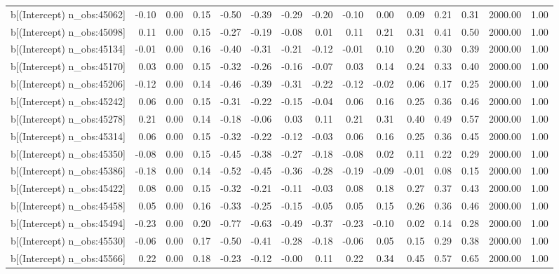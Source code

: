 \begin{table}[ht]
\begin{tabular}{rrrrrrrrrrrrrrr}
  b[(Intercept) n\_obs:45062] & -0.10 & 0.00 & 0.15 & -0.50 & -0.39 & -0.29 & -0.20 & -0.10 & 0.00 & 0.09 & 0.21 & 0.31 & 2000.00 & 1.00 \\ 
  b[(Intercept) n\_obs:45098] & 0.11 & 0.00 & 0.15 & -0.27 & -0.19 & -0.08 & 0.01 & 0.11 & 0.21 & 0.31 & 0.41 & 0.50 & 2000.00 & 1.00 \\ 
  b[(Intercept) n\_obs:45134] & -0.01 & 0.00 & 0.16 & -0.40 & -0.31 & -0.21 & -0.12 & -0.01 & 0.10 & 0.20 & 0.30 & 0.39 & 2000.00 & 1.00 \\ 
  b[(Intercept) n\_obs:45170] & 0.03 & 0.00 & 0.15 & -0.32 & -0.26 & -0.16 & -0.07 & 0.03 & 0.14 & 0.24 & 0.33 & 0.40 & 2000.00 & 1.00 \\ 
  b[(Intercept) n\_obs:45206] & -0.12 & 0.00 & 0.14 & -0.46 & -0.39 & -0.31 & -0.22 & -0.12 & -0.02 & 0.06 & 0.17 & 0.25 & 2000.00 & 1.00 \\ 
  b[(Intercept) n\_obs:45242] & 0.06 & 0.00 & 0.15 & -0.31 & -0.22 & -0.15 & -0.04 & 0.06 & 0.16 & 0.25 & 0.36 & 0.46 & 2000.00 & 1.00 \\ 
  b[(Intercept) n\_obs:45278] & 0.21 & 0.00 & 0.14 & -0.18 & -0.06 & 0.03 & 0.11 & 0.21 & 0.31 & 0.40 & 0.49 & 0.57 & 2000.00 & 1.00 \\ 
  b[(Intercept) n\_obs:45314] & 0.06 & 0.00 & 0.15 & -0.32 & -0.22 & -0.12 & -0.03 & 0.06 & 0.16 & 0.25 & 0.36 & 0.45 & 2000.00 & 1.00 \\ 
  b[(Intercept) n\_obs:45350] & -0.08 & 0.00 & 0.15 & -0.45 & -0.38 & -0.27 & -0.18 & -0.08 & 0.02 & 0.11 & 0.22 & 0.29 & 2000.00 & 1.00 \\ 
  b[(Intercept) n\_obs:45386] & -0.18 & 0.00 & 0.14 & -0.52 & -0.45 & -0.36 & -0.28 & -0.19 & -0.09 & -0.01 & 0.08 & 0.15 & 2000.00 & 1.00 \\ 
  b[(Intercept) n\_obs:45422] & 0.08 & 0.00 & 0.15 & -0.32 & -0.21 & -0.11 & -0.03 & 0.08 & 0.18 & 0.27 & 0.37 & 0.43 & 2000.00 & 1.00 \\ 
  b[(Intercept) n\_obs:45458] & 0.05 & 0.00 & 0.16 & -0.33 & -0.25 & -0.15 & -0.05 & 0.05 & 0.15 & 0.26 & 0.36 & 0.46 & 2000.00 & 1.00 \\ 
  b[(Intercept) n\_obs:45494] & -0.23 & 0.00 & 0.20 & -0.77 & -0.63 & -0.49 & -0.37 & -0.23 & -0.10 & 0.02 & 0.14 & 0.28 & 2000.00 & 1.00 \\ 
  b[(Intercept) n\_obs:45530] & -0.06 & 0.00 & 0.17 & -0.50 & -0.41 & -0.28 & -0.18 & -0.06 & 0.05 & 0.15 & 0.29 & 0.38 & 2000.00 & 1.00 \\ 
  b[(Intercept) n\_obs:45566] & 0.22 & 0.00 & 0.18 & -0.23 & -0.12 & -0.00 & 0.11 & 0.22 & 0.34 & 0.45 & 0.57 & 0.65 & 2000.00 & 1.00 \\ 

\end{tabular}
\end{table}
